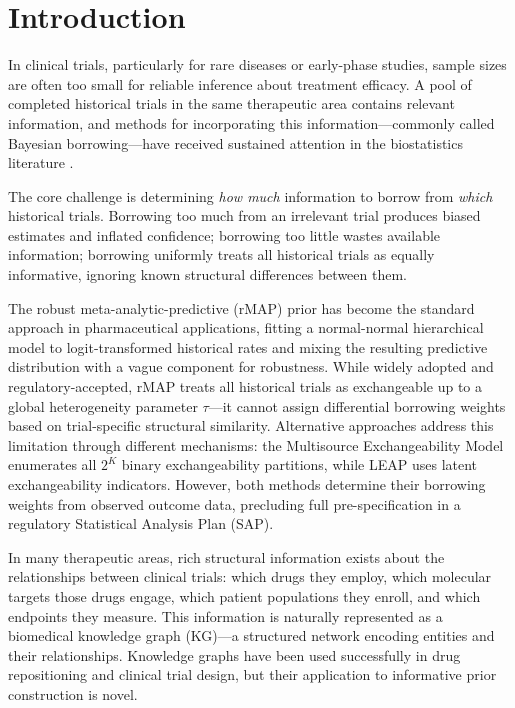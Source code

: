 \documentclass[12pt]{article}
\begin{document}
\section{Introduction}
\label{sec:intro}

In clinical trials, particularly for rare diseases or early-phase studies, sample sizes are often too small for reliable inference about treatment efficacy. A pool of completed historical trials in the same therapeutic area contains relevant information, and methods for incorporating this information---commonly called Bayesian borrowing---have received sustained attention in the biostatistics literature \citep{viele2014use, neuenschwander2010summarizing}.

The core challenge is determining \emph{how much} information to borrow from \emph{which} historical trials. Borrowing too much from an irrelevant trial produces biased estimates and inflated confidence; borrowing too little wastes available information; borrowing uniformly treats all historical trials as equally informative, ignoring known structural differences between them.

The robust meta-analytic-predictive (rMAP) prior \citep{schmidli2014robust} has become the standard approach in pharmaceutical applications, fitting a normal-normal hierarchical model to logit-transformed historical rates and mixing the resulting predictive distribution with a vague component for robustness. While widely adopted and regulatory-accepted, rMAP treats all historical trials as exchangeable up to a global heterogeneity parameter $\tau$---it cannot assign differential borrowing weights based on trial-specific structural similarity. Alternative approaches address this limitation through different mechanisms: the Multisource Exchangeability Model \citep[MEM;][]{kaizer2018bayesian} enumerates all $2^K$ binary exchangeability partitions, while LEAP \citep{alt2024leap} uses latent exchangeability indicators. However, both methods determine their borrowing weights from observed outcome data, precluding full pre-specification in a regulatory Statistical Analysis Plan (SAP).

In many therapeutic areas, rich structural information exists about the relationships between clinical trials: which drugs they employ, which molecular targets those drugs engage, which patient populations they enroll, and which endpoints they measure. This information is naturally represented as a biomedical knowledge graph (KG)---a structured network encoding entities and their relationships. Knowledge graphs have been used successfully in drug repositioning \citep{himmelstein2017systematic} and clinical trial design, but their application to informative prior construction is novel.
\end{document}

